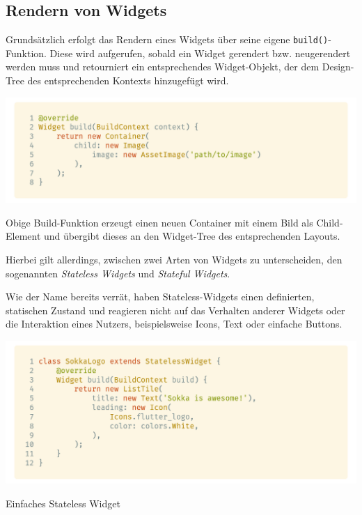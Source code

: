 
\subsection{Rendern von Widgets}

Grundsätzlich erfolgt das Rendern eines Widgets über seine eigene \lstinline{build()}-Funktion. Diese wird aufgerufen,
sobald ein Widget gerendert bzw. neugerendert werden muss und retourniert ein entsprechendes Widget-Objekt,
der dem Design-Tree des entsprechenden Kontexts hinzugefügt wird.

\begin{code}
    \centering
    \includegraphics[width=1\textwidth]{images/Flutter/flutterBuildFunction.png}
    \caption{\lstinline{build()}-Funktion eines Widgets}
\end{code}

Obige Build-Funktion erzeugt einen neuen Container mit einem Bild als Child-Element und übergibt dieses
an den Widget-Tree des entsprechenden Layouts.

Hierbei gilt allerdings, zwischen zwei Arten von Widgets zu unterscheiden, den sogenannten \textit{Stateless Widgets}
und \textit{Stateful Widgets}.

Wie der Name bereits verrät, haben Stateless-Widgets einen definierten, statischen Zustand und reagieren nicht
auf das Verhalten anderer Widgets oder die Interaktion eines Nutzers, beispielsweise Icons, Text oder einfache
Buttons.

\begin{code}
    \centering
    \includegraphics[width=1\textwidth]{images/Flutter/flutterStatelessWidget.png}
    \caption{Einfaches Stateless Widget}
\end{code}

